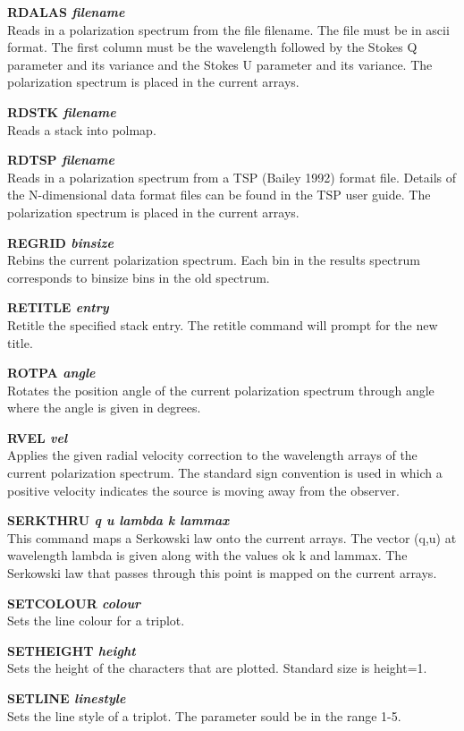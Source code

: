 {\bf RDALAS \it filename } \\
Reads in a polarization spectrum from the file filename. The file must
be in ascii format. The first column must be the wavelength followed
by the Stokes Q parameter and its variance and the Stokes U parameter
and its variance.  The polarization spectrum is placed in the current
arrays.

{\bf RDSTK \it filename } \\
Reads a stack into  polmap.

{\bf RDTSP \it filename } \\
Reads in a polarization spectrum from a  TSP (Bailey 1992) format file.
Details of the N-dimensional data format files can be found in the  TSP
user guide. The polarization spectrum is placed in the current arrays.

{\bf REGRID \it binsize} \\
Rebins the current polarization spectrum. Each bin in the results spectrum
corresponds to binsize bins in the old spectrum.

{\bf RETITLE \it entry} \\
Retitle the specified stack entry. The retitle command will prompt for the
new title.

{\bf ROTPA \it angle } \\
Rotates the position angle of the current polarization spectrum through
angle where the angle is given in degrees.

{\bf RVEL \it vel} \\
Applies the given radial velocity correction to the wavelength arrays
of the current polarization spectrum. The standard sign convention is
used in which a positive velocity indicates the source is moving away
from the observer.

{\bf SERKTHRU \it q u lambda k lammax} \\
This command maps a Serkowski law onto the current arrays. The vector
(q,u) at wavelength lambda is given along with the values ok k and
lammax. The Serkowski law that passes through this point is mapped on
the current arrays.

{\bf SETCOLOUR \it colour} \\
Sets the line colour for a triplot.

{\bf SETHEIGHT \it height} \\
Sets the height of the characters that are plotted. Standard size is height=1.

{\bf SETLINE \it linestyle} \\
Sets the line style of a triplot. The parameter sould be in the range 1-5.

